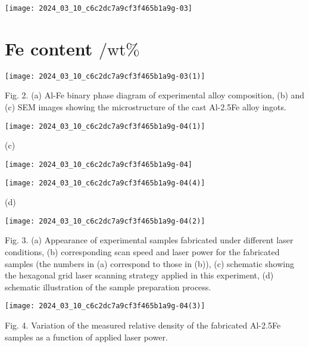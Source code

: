 \documentclass[10pt]{article}
\begin{document}
\begin{center}
\texttt{[image: 2024\_03\_10\_c6c2dc7a9cf3f465b1a9g-03]}
\end{center}

\section*{Fe content $/ \mathrm{wt} \%$}
\begin{center}
\texttt{[image: 2024\_03\_10\_c6c2dc7a9cf3f465b1a9g-03(1)]}
\end{center}

Fig. 2. (a) Al-Fe binary phase diagram of experimental alloy composition, (b) and (c) SEM images showing the microstructure of the cast Al-2.5Fe alloy ingots.

\begin{center}
\texttt{[image: 2024\_03\_10\_c6c2dc7a9cf3f465b1a9g-04(1)]}
\end{center}

(c)

\begin{center}
\texttt{[image: 2024\_03\_10\_c6c2dc7a9cf3f465b1a9g-04]}
\end{center}

\begin{center}
\texttt{[image: 2024\_03\_10\_c6c2dc7a9cf3f465b1a9g-04(4)]}
\end{center}

(d)

\begin{center}
\texttt{[image: 2024\_03\_10\_c6c2dc7a9cf3f465b1a9g-04(2)]}
\end{center}

Fig. 3. (a) Appearance of experimental samples fabricated under different laser conditions, (b) corresponding scan speed and laser power for the fabricated samples (the numbers in (a) correspond to those in (b)), (c) schematic showing the hexagonal grid laser scanning strategy applied in this experiment, (d) schematic illustration of the sample preparation process.

\begin{center}
\texttt{[image: 2024\_03\_10\_c6c2dc7a9cf3f465b1a9g-04(3)]}
\end{center}

Fig. 4. Variation of the measured relative density of the fabricated Al-2.5Fe samples as a function of applied laser power.
\end{document}
